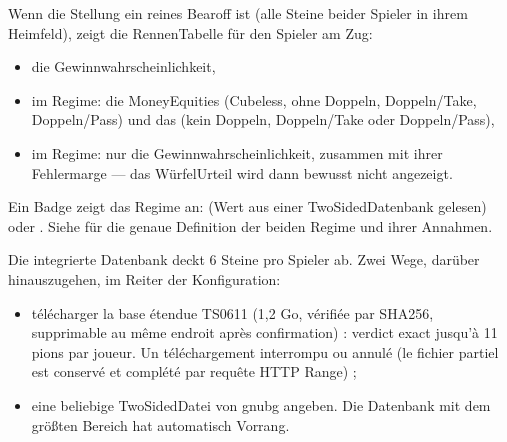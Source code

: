 \documentclass[letterpaper,10pt,german]{sphinxmanual}
\begin{document}
\sphinxAtStartPar
Wenn die Stellung ein reines Bearoff ist (alle Steine beider Spieler in ihrem Heimfeld), zeigt die Rennen\sphinxhyphen{}Tabelle für den Spieler am Zug:
\begin{itemize}
\item {} 
\sphinxAtStartPar
die Gewinnwahrscheinlichkeit,

\item {} 
\sphinxAtStartPar
im  Regime: die Money\sphinxhyphen{}Equities (Cubeless, ohne Doppeln, Doppeln/Take, Doppeln/Pass) und das  (kein Doppeln, Doppeln/Take oder Doppeln/Pass),

\item {} 
\sphinxAtStartPar
im  Regime: nur die Gewinnwahrscheinlichkeit, zusammen mit ihrer Fehlermarge — das Würfel\sphinxhyphen{}Urteil wird dann bewusst nicht angezeigt.

\end{itemize}

\sphinxAtStartPar
Ein Badge zeigt das Regime an:  (Wert aus einer Two\sphinxhyphen{}Sided\sphinxhyphen{}Datenbank gelesen) oder . Siehe {\hyperref[\detokenize{manuel:epc-methodologie}]{}} für die genaue Definition der beiden Regime und ihrer Annahmen.

\sphinxAtStartPar
{} Die integrierte Datenbank deckt 6 Steine pro Spieler ab. Zwei Wege, darüber hinauszugehen, im Reiter  der Konfiguration:
\begin{itemize}
\item {} 
\sphinxAtStartPar
télécharger la base étendue TS\sphinxhyphen{}06\sphinxhyphen{}11 (1,2 Go, vérifiée par SHA\sphinxhyphen{}256,
supprimable au même endroit après confirmation) : verdict exact jusqu’à
11 pions par joueur. Un téléchargement interrompu ou annulé  (le fichier partiel est conservé et complété par
requête HTTP Range) ;

\item {} 
\sphinxAtStartPar
eine beliebige Two\sphinxhyphen{}Sided\sphinxhyphen{}\sphinxhyphen{}Datei von gnubg angeben. Die Datenbank mit dem größten Bereich hat automatisch Vorrang.

\end{itemize}
\end{document}
